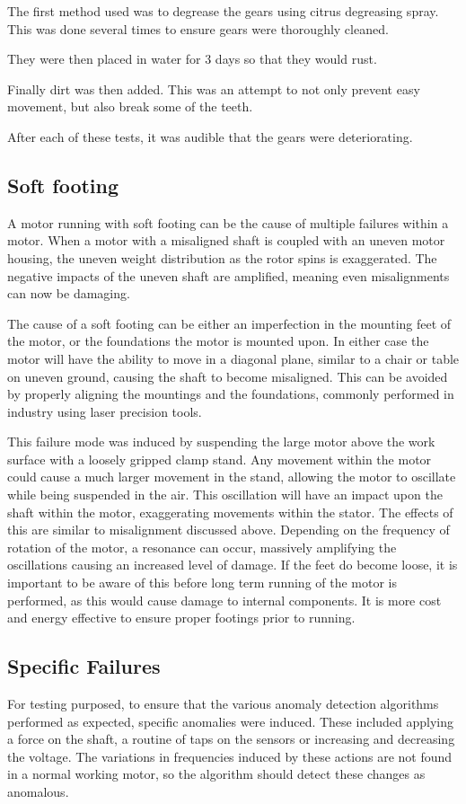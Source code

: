 The first method used was to degrease the gears using citrus degreasing spray. This was done several times to ensure gears were thoroughly cleaned.

They were then placed in water for 3 days so that they would rust.

Finally dirt was then added. This was an attempt to not only prevent easy movement, but also break some of the teeth.

After each of these tests, it was audible that the gears were deteriorating. 


\subsection{Soft footing}

A motor running with soft footing can be the cause of multiple failures within a motor. When a motor with a misaligned shaft is coupled with an uneven motor housing, the uneven weight distribution as the rotor spins is exaggerated. The negative impacts of the uneven shaft are amplified, meaning even misalignments can now be damaging. 

The cause of a soft footing can be either an imperfection in the mounting feet of the motor, or the foundations the motor is mounted upon. In either case the motor will have the ability to move in a diagonal plane, similar to a chair or table on uneven ground, causing the shaft to become misaligned. This can be avoided by properly aligning the mountings and the foundations, commonly performed in industry using laser precision tools. 

This failure mode was induced by suspending the large motor above the work surface with a loosely gripped clamp stand. Any movement within the motor could cause a much larger movement in the stand, allowing the motor to oscillate while being suspended in the air. This oscillation will have an impact upon the shaft within the motor, exaggerating movements within the stator. The effects of this are similar to misalignment discussed above. Depending on the frequency of rotation of the motor, a resonance can occur, massively amplifying the oscillations causing an increased level of damage. If the feet do become loose, it is important to be aware of this before long term running of the motor is performed, as this would cause damage to internal components. It is more cost and energy effective to ensure proper footings prior to running.

\subsection{Specific Failures}

For testing purposed, to ensure that the various anomaly detection algorithms performed as expected, specific anomalies were induced. These included applying a force on the shaft, a routine of taps on the sensors or increasing and decreasing the voltage. The variations in frequencies induced by these actions are not found in a normal working motor, so the algorithm should detect these changes as anomalous. 